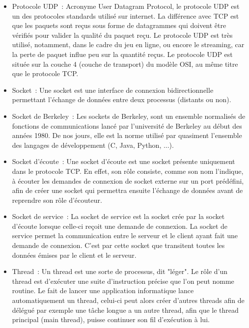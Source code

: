\begin{appendices}
\begin{itemize}
	\item Protocole UDP~:
    Acronyme User Datagram Protocol, le protocole UDP est un des protocoles standards utilisé sur internet. 
    La différence avec TCP est que les paquets sont reçus sous forme de datagrammes qui doivent être vérifiés pour valider la qualité du paquet reçu.
    Le protocole UDP est très utilisé, notamment, dans le cadre du jeu en ligne, ou encore le streaming, car la perte de paquet influe peu sur la quantité reçus.
    Le protocole UDP est située sur la couche 4 (couche de transport) du modèle OSI, au même titre que le protocole TCP. 
   \newline

	\item Socket~:
    Une socket est une interface de connexion bidirectionnelle permettant l'échange de données entre deux processus (distants ou non).
	\newline
 
	\item Socket de Berkeley~:
    Les sockets de Berkeley, sont un ensemble normalisés de fonctions de communications lancé par l'université de Berkeley au début des années 1980.
    De nos jours, elle est la norme utilisé par quasiment l'ensemble des langages de développement (C, Java, Python, ...).
    \newline
  
	\item Socket d'écoute~:
    Une socket d'écoute est une socket présente uniquement dans le protocole TCP. En effet, son rôle consiste, comme son nom l'indique, à écouter les demandes de connexion de socket externe sur un port prédéfini, afin de créer une socket qui permettra ensuite l'échange de données avant de reprendre son rôle d'écouteur.
	\newline
  
	\item Socket de service~:
    La socket de service est la socket crée par la socket d'écoute lorsque celle-ci reçoit une demande de connexion. La socket de service permet la communication entre le serveur et le client ayant fait une demande de connexion. C'est par cette socket que transitent toutes les données émises par le client et le serveur.
	\newline
  
	\item Thread~:
	Un thread est une sorte de processus, dit "léger". Le rôle d'un thread est d'exécuter une suite d'instruction précise que l'on peut nomme routine.
	Le fait de lancer une application informatique lance automatiquement un thread, celui-ci peut alors créer d'autres threads afin de délégué par exemple une tâche longue a un autre thread, afin que le thread principal (main thread), puisse continuer son fil d'exécution à lui.
	\newline


\end{itemize}
\end{appendices}

